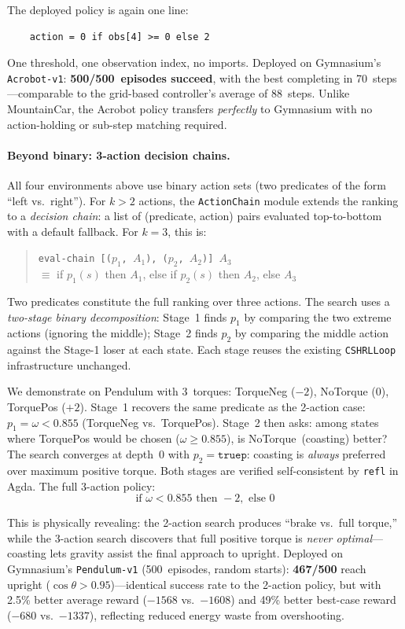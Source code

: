 \documentclass[9pt,a4paper]{article}
\theoremstyle{plain}
\theoremstyle{definition}
\theoremstyle{remark}
\begin{document}
The deployed policy is again one line:
\begin{verbatim}
    action = 0 if obs[4] >= 0 else 2
\end{verbatim}

\noindent One threshold, one observation index, no imports.  Deployed on Gymnasium's \texttt{Acrobot-v1}: \textbf{500/500~episodes succeed}, with the best completing in 70~steps---comparable to the grid-based controller's average of 88~steps.  Unlike MountainCar, the Acrobot policy transfers \emph{perfectly} to Gymnasium with no action-holding or sub-step matching required.

\paragraph{Beyond binary: 3-action decision chains.}
All four environments above use binary action sets (two predicates of the form ``left vs.\ right'').  For $k > 2$ actions, the \texttt{ActionChain} module extends the ranking to a \emph{decision chain}: a list of (predicate, action) pairs evaluated top-to-bottom with a default fallback.  For $k = 3$, this is:
\begin{quote}
\texttt{eval-chain [($p_1$, $A_1$), ($p_2$, $A_2$)] $A_3$}
\\[2pt]
$\equiv$ if $p_1(s)$ then $A_1$, else if $p_2(s)$ then $A_2$, else $A_3$
\end{quote}

\noindent Two predicates constitute the full ranking over three actions.  The search uses a \emph{two-stage binary decomposition}: Stage~1 finds $p_1$ by comparing the two extreme actions (ignoring the middle); Stage~2 finds $p_2$ by comparing the middle action against the Stage-1 loser at each state.  Each stage reuses the existing \texttt{CSHRLLoop} infrastructure unchanged.

We demonstrate on Pendulum with 3~torques: TorqueNeg ($-2$), NoTorque ($0$), TorquePos ($+2$).  Stage~1 recovers the same predicate as the 2-action case: $p_1 = \omega < 0.855$ (TorqueNeg vs.\ TorquePos).  Stage~2 then asks: among states where TorquePos would be chosen ($\omega \geq 0.855$), is NoTorque~(coasting) better?  The search converges at depth~0 with $p_2 = \texttt{truep}$: coasting is \emph{always} preferred over maximum positive torque.  Both stages are verified self-consistent by \texttt{refl} in Agda.  The full 3-action policy:
\[
\boxed{\quad \text{if } \omega < 0.855 \text{ then } {-}2, \text{ else } 0 \quad}
\]

\noindent This is physically revealing: the 2-action search produces ``brake vs.\ full torque,'' while the 3-action search discovers that full positive torque is \emph{never optimal}---coasting lets gravity assist the final approach to upright.  Deployed on Gymnasium's \texttt{Pendulum-v1} (500~episodes, random starts): \textbf{467/500} reach upright ($\cos\theta > 0.95$)---identical success rate to the 2-action policy, but with 2.5\% better average reward ($-1568$ vs.\ $-1608$) and 49\% better best-case reward ($-680$ vs.\ $-1337$), reflecting reduced energy waste from overshooting.
\end{document}
